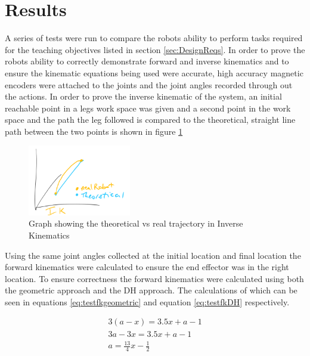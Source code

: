 \documentclass[conference]{IEEEtran}
\begin{document}
\section{Results}
\label{sec:results}
A series of tests were run to compare the robots ability to perform tasks required for the teaching objectives listed in section \ref{sec:DesignReqs}. In order to prove the robots ability to correctly demonstrate forward and inverse kinematics and to ensure the kinematic equations being used were accurate, high accuracy magnetic encoders were attached to the joints and the joint angles recorded through out the actions. In order to prove the inverse kinematic of the system, an initial reachable point in a legs work space was given and a second point in the work space  and the path the leg followed is compared to the theoretical, straight line path between the two points is shown in figure \ref{fig:IK}

    \begin{figure}[H]
	\centering
      \includegraphics[width=0.4\textwidth]{Images/ik.png}
  	\caption{Graph showing the theoretical vs real trajectory in Inverse Kinematics}
  	\label{fig:IK}
\end{figure}

Using the same joint angles collected at the initial location and final location the forward kinematics were calculated to ensure the end effector was in the right location. To ensure correctness the forward kinematics were calculated using both the geometric approach and the DH approach. The calculations of which can be seen in equations \ref{eq:testfkgeometric} and equation \ref{eq:testfkDH} respectively.
\begin{eqfloat}[H]
$$
        \begin{aligned}
            3(a-x) = 3.5x + a - 1           \\
            3a - 3x = 3.5x + a -1           \\
            a = \frac{13}{4}x - \frac{1}{2} 
        \end{aligned}
$$
\caption{\label{eq:testfkgeometric}Forward kinematics Geometrically solved}
    
\end{eqfloat}
\end{document}
